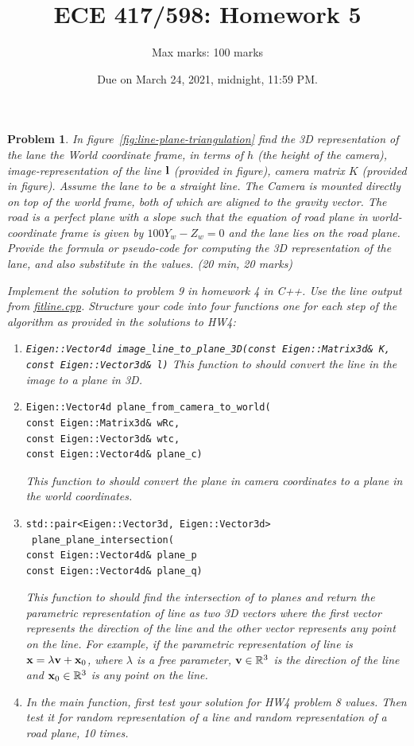 \documentclass{article}
\title{ECE 417/598: Homework 5}
\author{Max marks: 100 marks}
\date{Due on March 24, 2021, midnight, 11:59 PM.}
\newtheorem{prob}{Problem}
\begin{document}
\maketitle

\begin{prob}
  In figure~\ref{fig:line-plane-triangulation} find the 3D representation of the
  lane the World coordinate frame, in terms of $h$ (the height of the camera),
  image-representation of the line $\mathbf{l}$ (provided in figure), camera matrix
  $K$ (provided in figure). Assume the lane to be a straight line.
  The Camera is mounted directly on top of the
  world frame, both of which are aligned to the gravity vector.
  The road is a perfect plane with a slope such that the equation of road plane
  in world-coordinate frame is given by $100 Y_w - Z_w = 0$ and the lane lies
  on the road plane. Provide the formula or pseudo-code for computing the
  3D representation of the lane, and also substitute in the values. (20 min, 20 marks)

  \label{prob:lane-plane-triangulation}

  Implement the solution to problem 9 in homework 4 in C++.  
  Use the line output from
  \href{https://github.com/wecacuee/ECE417-Mobile-Robots/blob/master/docs/slides/03-11-svd-null-space/code/}{fitline.cpp}.
  Structure your code into four functions one for each step of the algorithm as
  provided in the solutions to HW4:
  \begin{enumerate}
  \item \verb|Eigen::Vector4d image_line_to_plane_3D(const Eigen::Matrix3d& K, const Eigen::Vector3d& l)|
   This function to should convert the line in the image to a plane in 3D.
 \item
\begin{verbatim}
Eigen::Vector4d plane_from_camera_to_world(
const Eigen::Matrix3d& wRc,
const Eigen::Vector3d& wtc,
const Eigen::Vector4d& plane_c)
\end{verbatim}
   This function to should convert the plane in camera coordinates to a plane in
   the world coordinates.
 \item
\begin{verbatim}
std::pair<Eigen::Vector3d, Eigen::Vector3d>
 plane_plane_intersection(
const Eigen::Vector4d& plane_p
const Eigen::Vector4d& plane_q)
\end{verbatim}
   This function to should find the intersection of to planes and return the
   parametric representation of line as two 3D vectors where the first vector represents the
   direction of the line and the other vector represents any point on the line.
   For example, if the parametric representation of line is $\mathbf{x} = \lambda \mathbf{v}
   + \mathbf{x}_0$, where $\lambda$ is a free parameter, $\mathbf{v} \in \mathbb{R}^3$ is the
   direction of the line and  $\mathbf{x}_0 \in \mathbb{R}^3$ is any point on the line.
 \item
   In the main function, first test your solution for HW4 problem 8 values.
   Then
   test it for random representation of a line and random representation of a road plane, 10 times. 
\end{enumerate}
  
\end{prob}
\end{document}
